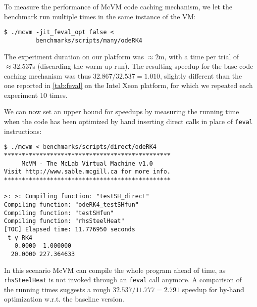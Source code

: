 \noindent To measure the performance of McVM code caching mechanism, we let the benchmark run multiple times in the same instance of the VM:

\begin{small}
\begin{verbatim}
$ ./mcvm -jit_feval_opt false <
         benchmarks/scripts/many/odeRK4
\end{verbatim}
\end{small}

\noindent The experiment duration on our platform was $\approx2$m, with a time per trial of $\approx32.537$s (discarding the warm-up run). The resulting speedup for the base code caching mechanism was thus $32.867/32.537=1.010$, slightly different than the one reported in \mytable\ref{tab:feval} on the Intel Xeon platform, for which we repeated each experiment $10$ times.

We can now set an upper bound for speedups by measuring the running time when the code has been optimized by hand inserting direct calls in place of {\tt feval} instructions:

\begin{small}
\begin{verbatim}
$ ./mcvm < benchmarks/scripts/direct/odeRK4
***********************************************
     McVM - The McLab Virtual Machine v1.0
Visit http://www.sable.mcgill.ca for more info.
***********************************************

>: >: Compiling function: "testSH_direct"
Compiling function: "odeRK4_testSHfun"
Compiling function: "testSHfun"
Compiling function: "rhsSteelHeat"
[TOC] Elapsed time: 11.776950 seconds
 t y_RK4
   0.0000  1.000000
  20.0000 227.364633
\end{verbatim}
\end{small}

\noindent In this scenario McVM can compile the whole program ahead of time, as {\tt rhsSteelHeat} is not invoked through an {\tt feval} call anymore. A comparison of the running times suggests a rough $32.537/11.777=2.791$ speedup for by-hand optimization w.r.t. the baseline version.
